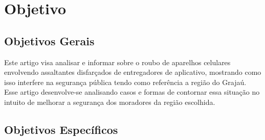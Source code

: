 \section{Objetivo}

    \subsection{Objetivos Gerais}


        Este artigo visa analisar e informar sobre o roubo de aparelhos celulares envolvendo
        assaltantes disfarçados de entregadores de aplicativo, mostrando como isso interfere
        na segurança pública tendo como referência a região do Grajaú. Esse artigo desenvolve-se
        analisando casos e formas de contornar essa situação no intuito de melhorar a segurança
        dos moradores da região escolhida.

    \subsection{Objetivos Específicos}